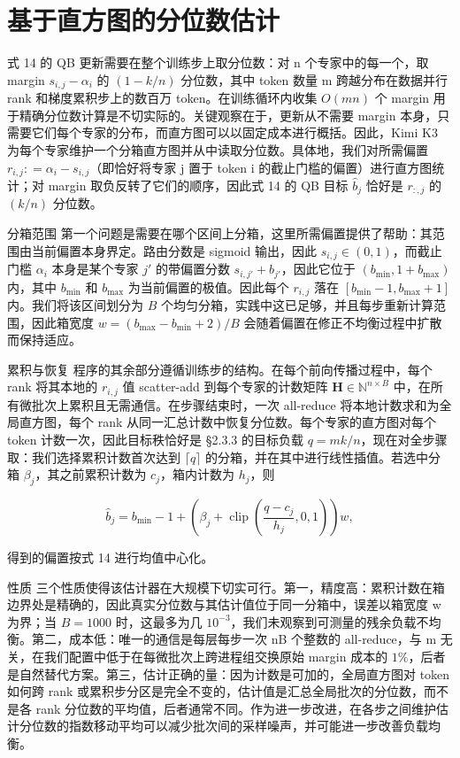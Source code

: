 \documentclass[
  10
]{article}
\begin{document}
\section{基于直方图的分位数估计}\label{d-histogram-based-quantile-estimation}

式 14 的 QB 更新需要在整个训练步上取分位数：对 n 个专家中的每一个，取 margin \(s _ { i , j } - \alpha _ { i }\) 的 \(( 1 - k / n )\) 分位数，其中 token 数量 m 跨越分布在数据并行 rank 和梯度累积步上的数百万 token。在训练循环内收集 \(O(mn)\) 个 margin 用于精确分位数计算是不切实际的。关键观察在于，更新从不需要 margin 本身，只需要它们每个专家的分布，而直方图可以以固定成本进行概括。因此，Kimi K3 为每个专家维护一个分箱直方图并从中读取分位数。具体地，我们对所需偏置 \(r _ { i , j } : = \alpha _ { i } - s _ { i , j }\)（即恰好将专家 j 置于 token i 的截止门槛的偏置）进行直方图统计；对 margin 取负反转了它们的顺序，因此式 14 的 QB 目标 \(\widehat { b } _ { j }\) 恰好是 \(r _ { : , j }\) 的 \((k/n)\) 分位数。

分箱范围 第一个问题是需要在哪个区间上分箱，这里所需偏置提供了帮助：其范围由当前偏置本身界定。路由分数是 sigmoid 输出，因此 \(s _ { i , j } \in ( 0 , 1 )\)，而截止门槛 \(\alpha _ { i }\) 本身是某个专家 \(j'\) 的带偏置分数 \(s _ { i , j' } + b _ { j' }\)，因此它位于 \((b_{\min}, 1 + b_{\max})\) 内，其中 \(b_{\min}\) 和 \(b_{\max}\) 为当前偏置的极值。因此每个 \(r_{i,j}\) 落在 \([b_{\min} - 1, b_{\max} + 1]\) 内。我们将该区间划分为 \(B\) 个均匀分箱，实践中这已足够，并且每步重新计算范围，因此箱宽度 \(w = (b_{\max} - b_{\min} + 2) / B\) 会随着偏置在修正不均衡过程中扩散而保持适应。

累积与恢复 程序的其余部分遵循训练步的结构。在每个前向传播过程中，每个 rank 将其本地的 \(r_{i,j}\) 值 scatter-add 到每个专家的计数矩阵 \(\mathbf{H} \in \mathbb{N}^{n \times B}\) 中，在所有微批次上累积且无需通信。在步骤结束时，一次 all-reduce 将本地计数求和为全局直方图，每个 rank 从同一汇总计数中恢复分位数。每个专家的直方图对每个 token 计数一次，因此目标秩恰好是 §2.3.3 的目标负载 \(q = m k / n\)，现在对全步骤取：我们选择累积计数首次达到 \(\lceil q \rceil\) 的分箱，并在其中进行线性插值。若选中分箱 \(\beta_j\)，其之前累积计数为 \(c_j\)，箱内计数为 \(h_j\)，则

\[
\widehat{b}_j = b_{\min} - 1 + \left(\beta_j + \operatorname{clip}\left(\frac{q - c_j}{h_j}, 0, 1\right)\right) w,
\]

得到的偏置按式 14 进行均值中心化。

性质 三个性质使得该估计器在大规模下切实可行。第一，精度高：累积计数在箱边界处是精确的，因此真实分位数与其估计值位于同一分箱中，误差以箱宽度 w 为界；当 \(B = 1000\) 时，这最多为几 \(10^{-3}\)，我们未观察到可测量的残余负载不均衡。第二，成本低：唯一的通信是每层每步一次 nB 个整数的 all-reduce，与 m 无关，在我们配置中低于在每微批次上跨进程组交换原始 margin 成本的 \(1\%\)，后者是自然替代方案。第三，估计正确的量：因为计数是可加的，全局直方图对 token 如何跨 rank 或累积步分区是完全不变的，估计值是汇总全局批次的分位数，而不是各 rank 分位数的平均值，后者通常不同。作为进一步改进，在各步之间维护估计分位数的指数移动平均可以减少批次间的采样噪声，并可能进一步改善负载均衡。
\end{document}
